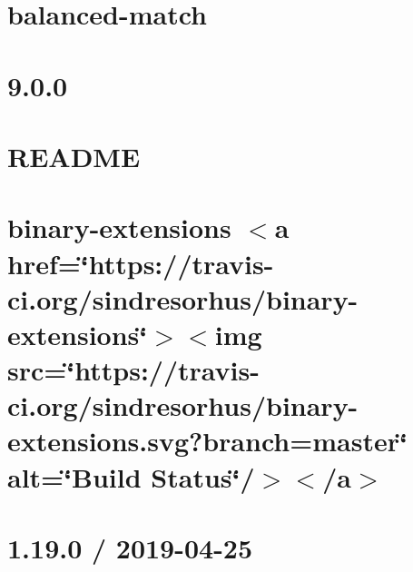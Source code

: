 \let\mypdfximage\pdfximage\def\pdfximage{\immediate\mypdfximage}\documentclass[twoside]{book}
\newcommand{\+}{\discretionary{\mbox{\scriptsize$\hookleftarrow$}}{}{}}
\begin{document}
\chapter{balanced-\/match}
\label{md__c_1__git_hub__p_r_o_y_e_c_t_o-_i_i_i-_g_o_t_rest-api_node_modules_balanced-match__r_e_a_d_m_e}

\chapter{9.0.0}
\label{md__c_1__git_hub__p_r_o_y_e_c_t_o-_i_i_i-_g_o_t_rest-api_node_modules_bignumber_8js__c_h_a_n_g_e_l_o_g}

\chapter{R\+E\+A\+D\+ME}
\label{md__c_1__git_hub__p_r_o_y_e_c_t_o-_i_i_i-_g_o_t_rest-api_node_modules_bignumber_8js__r_e_a_d_m_e}

\chapter{binary-\/extensions $<$a href=\char`\"{}https\+://travis-\/ci.\+org/sindresorhus/binary-\/extensions\char`\"{}$>$$<$img src=\char`\"{}https\+://travis-\/ci.\+org/sindresorhus/binary-\/extensions.\+svg?branch=master\char`\"{} alt=\char`\"{}\+Build Status\char`\"{}/$>$$<$/a$>$}
\label{md__c_1__git_hub__p_r_o_y_e_c_t_o-_i_i_i-_g_o_t_rest-api_node_modules_binary-extensions_readme}

\chapter{1.19.0 / 2019-\/04-\/25}
\label{md__c_1__git_hub__p_r_o_y_e_c_t_o-_i_i_i-_g_o_t_rest-api_node_modules_body-parser__h_i_s_t_o_r_y}

\end{document}
